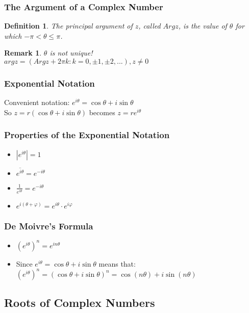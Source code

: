 \documentclass{article}
\newtheorem*{remark}{Remark}
\newtheorem{definition}{Definition}[section]
\begin{document}
\subsubsection{The Argument of a Complex Number}
\begin{definition}
The principal argument of $z$, called $Arg z$, is the value of $\theta$ for which $-\pi < \theta \leq \pi$.
\end{definition}
\begin{remark}
$\theta$ is not unique! \\
$arg z = \left(Arg z + 2\pi k : k = 0, \pm 1, \pm 2,...\right), z \neq 0$
\end{remark}

\subsubsection{Exponential Notation}
Convenient notation: $e^{i\theta} = \cos\theta + i \sin\theta$ \\
So $z = r(\cos\theta + i \sin\theta)$ becomes $z = re^{i\theta}$

\subsubsection{Properties of the Exponential Notation}
\begin{itemize}
\item $\left|e^{i\theta}\right| = 1$
\item $\overline{e^{i\theta}} = e^{-i\theta}$
\item $\frac{1}{e^{i\theta}} = e^{-i\theta}$
\item $e^{i(\theta + \varphi)} = e^{i\theta} \cdot e^{i\varphi}$
\end{itemize}

\subsubsection{De Moivre's Formula}
\begin{itemize}
\item $(e^{i\theta})^n = e^{in\theta}$
\item Since $e^{i\theta} = \cos\theta + i \sin\theta$ means that: \\
$(e^{i\theta})^n = (\cos\theta + i \sin\theta)^n = \cos(n\theta) + i \sin(n\theta)$
\end{itemize}

\subsection{Roots of Complex Numbers}
\end{document}
